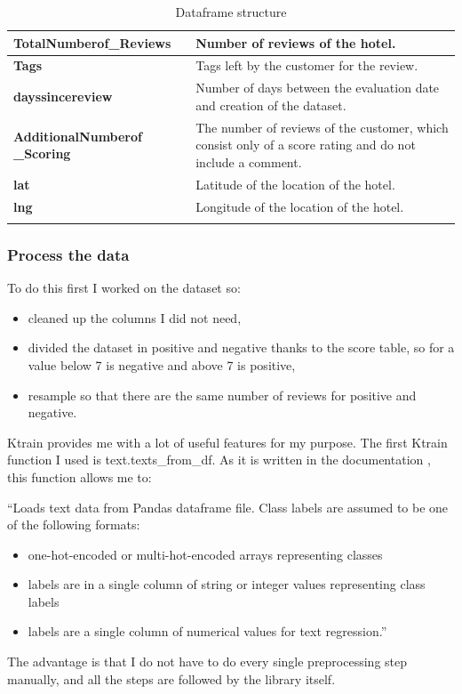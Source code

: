 \begin{longtable}[ c ]{| m{5cm} | m{8cm}|}
\textbf{TotalNumberof\_Reviews}               & Number of reviews of the hotel.                                                                   \\ \hline
\textbf{Tags}                                 & Tags left by the customer for the review.                                                 \\ \hline
\textbf{dayssincereview}                      & Number of days between the evaluation date and creation of the \gls{dataset}.                              \\ \hline
\textbf{AdditionalNumberof \_Scoring} & The number of reviews of the customer, which consist only of a score rating and do not include a comment. \\ \hline
\textbf{lat}                                  & Latitude of the location of the hotel.                                                                 \\ \hline
\textbf{lng}                                  & Longitude of the location of the hotel.                                                                  \\ \hline
\caption{Dataframe structure}
\label{tab:Dataframe structure}\\
\end{longtable}

\subsubsection{Process the data}
To do this first I worked on the dataset so:
\begin{itemize}
    \item cleaned up the columns I did not need,
    \item divided the dataset in positive and negative thanks to the score table, so for a value below 7 is negative and above 7 is positive,
    \item resample so that there are the same number of reviews for positive and negative.
\end{itemize}

Ktrain provides me with a lot of useful features for my purpose.
The first Ktrain function I used is text.texts\_from\_df.
As it is written in the documentation \cite{noauthor_amaiyaktrain_nodate}, this function allows me to:

“Loads text data from Pandas dataframe file. Class labels are assumed to be one of the following formats:
\begin{itemize}
    \item one-hot-encoded or multi-hot-encoded arrays representing classes
    \item labels are in a single column of string or integer values representing class labels
    \item labels are a single column of numerical values for text regression.”
\end{itemize}
The advantage is that I do not have to do every single preprocessing step manually, and all the steps are followed by the library itself.

